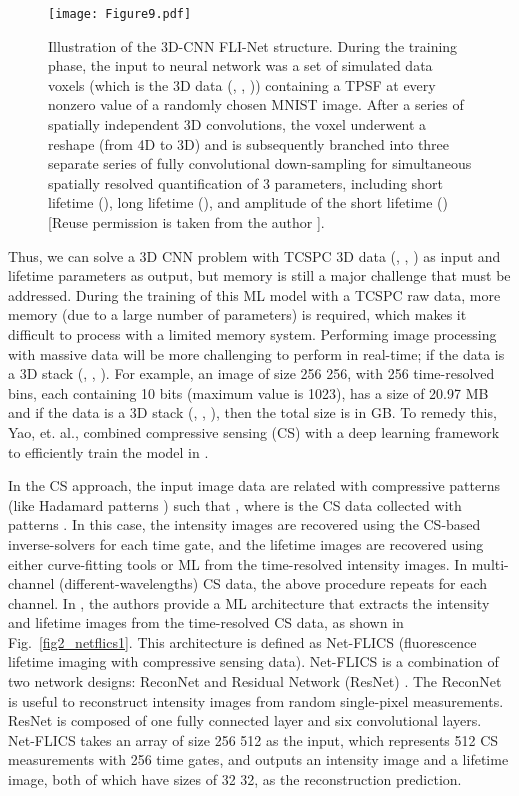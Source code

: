 \documentclass[12pt]{iopart}
\begin{document}
\begin{figure}[!t]
\centering
\texttt{[image: Figure9.pdf]}
\caption{Illustration of the 3D-CNN FLI-Net structure. During the training phase, the input to neural network was a set of simulated data voxels (which is the 3D data (, , )) containing a TPSF at every nonzero value of a randomly chosen MNIST image. After a series of spatially independent 3D convolutions, the voxel underwent a reshape (from 4D to 3D) and is subsequently branched into three separate series of fully convolutional down-sampling for simultaneous spatially resolved quantification of 3 parameters, including short lifetime (), long lifetime (), and amplitude of the short lifetime () [Reuse permission is taken from the author \cite{netflics2}].} \label{fig1_netflics2}
\end{figure}

Thus, we can solve a 3D CNN problem with TCSPC 3D data (, , ) as input and lifetime parameters as output, but memory is still a major challenge that must be addressed. During the training of this ML model with a TCSPC raw data, more memory (due to a large number of parameters) is required, which makes it difficult to process with a limited memory system. Performing image processing with massive data will be more challenging to perform in real-time; if the data is a 3D stack (, , ). For example, an image of size 256  256, with 256 time-resolved bins, each containing 10 bits (maximum value is 1023), has a size of 20.97 MB and if the data is a 3D stack (, , ), then the total size is in GB. To remedy this, Yao, et. al., combined compressive sensing (CS) with a deep learning framework to efficiently train the model in \cite{netflics1}.

In the CS approach, the input image data  are related with compressive patterns (like Hadamard patterns ) such that , where  is the CS data collected with patterns . In this case, the intensity images are recovered using the CS-based inverse-solvers for each time gate, and the lifetime images are recovered using either curve-fitting tools or ML from the time-resolved intensity images. In multi-channel (different-wavelengths) CS data, the above procedure repeats for each channel. In \cite{netflics1}, the authors provide a ML architecture that extracts the intensity and lifetime images from the time-resolved CS data, as shown in Fig.~\ref{fig2_netflics1}. This architecture is defined as Net-FLICS (fluorescence lifetime imaging with compressive sensing data). Net-FLICS is a combination of two network designs: ReconNet \cite{reconnet} and Residual Network (ResNet) \cite{resnet}. The ReconNet is useful to reconstruct intensity images from random single-pixel measurements. ResNet is composed of one fully connected layer and six convolutional layers. Net-FLICS takes an array of size 256  512 as the input, which represents 512 CS measurements with 256 time gates, and outputs an intensity image and a lifetime image, both of which have sizes of 32  32, as the reconstruction prediction.  
\end{document}
